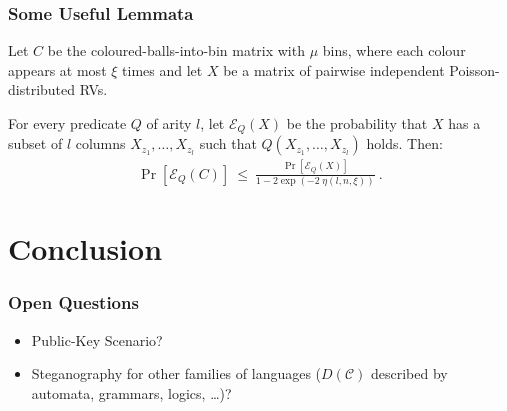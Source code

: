 \documentclass[german,table]{beamer}
\newcommand{\kla}{\mathrel{\ \le \ }}
\begin{document}
\begin{frame}
  \frametitle{Some Useful Lemmata}

  \begin{lemma}
    Let $C$ be the coloured-balls-into-bin matrix with $\mu$ bins, where
    each colour appears at most $\xi$ times and let $X$ be a matrix of
    pairwise independent Poisson-distributed RVs.

    For every predicate $Q$ of arity $l$, let $\mathcal{E}_{Q}(X)$ be the
    probability that $X$ has a subset of $l$ columns
    $X_{z_{1}}, \ldots,X_{z_{l}}$ such that
    $Q(X_{z_{1}}, \ldots,X_{z_{l}})$ holds. Then:
    \begin{align*}
      \Pr[\mathcal{E}_{Q}(C)] \kla
      \frac{\Pr[\mathcal{E}_{Q}(X)]}{1-2\exp\left(-2 \; \eta(l,n,\xi)\right)} \ . 
    \end{align*}

  \end{lemma}

  
\end{frame}




\section{Conclusion}
\begin{frame}
  \frametitle{Open Questions}
  \begin{itemize}[<+->]
  \item Public-Key Scenario?
  \item Steganography for other families of languages ($D(\mathcal{C})$
    described by automata, grammars, logics, \ldots)?
  \end{itemize}
\end{frame}
\end{document}
